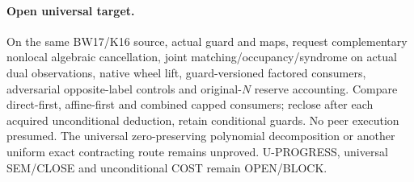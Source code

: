 \documentclass[11pt]{article}
\begin{document}
\paragraph{Open universal target.}
On the same BW17/K16 source, actual guard and maps, request complementary nonlocal algebraic cancellation, joint matching/occupancy/syndrome on actual dual observations, native wheel lift, guard-versioned factored consumers, adversarial opposite-label controls and original-$N$ reserve accounting. Compare direct-first, affine-first and combined capped consumers; reclose after each acquired unconditional deduction, retain conditional guards. No peer execution presumed. The universal zero-preserving polynomial decomposition or another uniform exact contracting route remains unproved. U-PROGRESS, universal SEM/CLOSE and unconditional COST remain OPEN/BLOCK.
\end{document}
